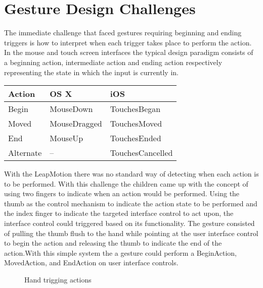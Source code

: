 \section{Gesture Design Challenges}
The immediate challenge that faced gestures requiring beginning and ending triggers is how to interpret when each trigger takes place to perform the action. In the mouse and touch screen interfaces the typical design paradigm consists of a beginning action, intermediate action and ending action respectively representing the state in which the input is currently in.

\begin{center}
 \label{tab:title} 
    \begin{tabular}{ | l | l | l |}
    \hline
    Action & OS X & iOS \\ \hline
    Begin  & MouseDown & TouchesBegan \\ \hline
    Moved & MouseDragged & TouchesMoved \\ \hline
    End & MouseUp & TouchesEnded \\ \hline
    Alternate & -- & TouchesCancelled \\ \hline
    \end{tabular}
\end{center}

With the LeapMotion there was no standard way of detecting when each action is to be performed. With this challenge the children came up with the concept of using two fingers to indicate when an action would be performed. Using the thumb as the control mechanism to indicate the action state to be performed and the index finger to indicate the targeted interface control to act upon, the interface control could triggered based on its functionality. The gesture consisted of pulling the thumb flush to the hand while pointing at the user interface control to begin the action and releasing the thumb to indicate the end of the action.With this simple system the a gesture could perform a BeginAction, MovedAction, and EndAction on user interface controls. 


\begin{figure}
\centering     %
{}
\caption{Hand trigging actions}
\end{figure}

